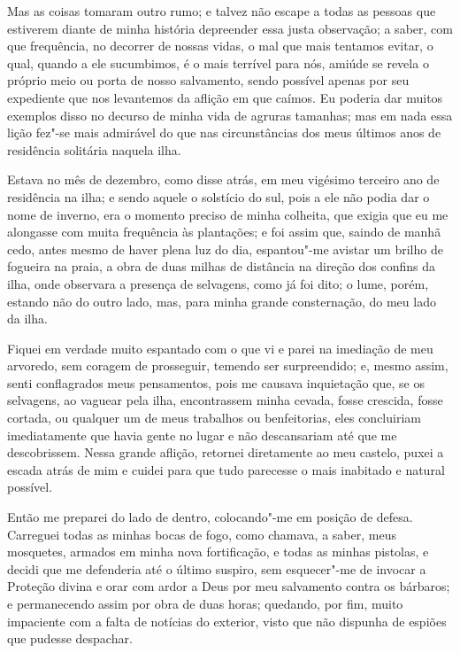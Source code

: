 Mas as coisas tomaram outro rumo; e talvez não escape a todas as pessoas
que estiverem diante de minha história depreender essa justa observação;
a saber, com que frequência, no decorrer de nossas vidas, o mal que mais
tentamos evitar, o qual, quando a ele sucumbimos, é o mais terrível para
nós, amiúde se revela o próprio meio ou porta de nosso salvamento, sendo
possível apenas por seu expediente que nos levantemos da aflição em que
caímos. Eu poderia dar muitos exemplos disso no decurso de minha vida de
agruras tamanhas; mas em nada essa lição fez"-se mais admirável do que
nas circunstâncias dos meus últimos anos de residência solitária naquela
ilha.

Estava no mês de dezembro, como disse atrás, em meu vigésimo terceiro
ano de residência na ilha; e sendo aquele o solstício do sul, pois a ele
não podia dar o nome de inverno, era o momento preciso de minha
colheita, que exigia que eu me alongasse com muita frequência às
plantações; e foi assim que, saindo de manhã cedo, antes mesmo de haver
plena luz do dia, espantou"-me avistar um brilho de fogueira na praia, a
obra de duas milhas de distância na direção dos confins da ilha, onde
observara a presença de selvagens, como já foi dito; o lume, porém,
estando não do outro lado, mas, para minha grande consternação, do meu
lado da ilha.

Fiquei em verdade muito espantado com o que vi e parei na imediação de
meu arvoredo, sem coragem de prosseguir, temendo ser surpreendido; e,
mesmo assim, senti conflagrados meus pensamentos, pois me causava
inquietação que, se os selvagens, ao vaguear pela ilha, encontrassem
minha cevada, fosse crescida, fosse cortada, ou qualquer um de meus
trabalhos ou benfeitorias, eles concluiriam imediatamente que havia
gente no lugar e não descansariam até que me descobrissem. Nessa grande
aflição, retornei diretamente ao meu castelo, puxei a escada atrás de
mim e cuidei para que tudo parecesse o mais inabitado e natural
possível.

Então me preparei do lado de dentro, colocando"-me em posição de defesa.
Carreguei todas as minhas bocas de fogo, como chamava, a saber, meus
mosquetes, armados em minha nova fortificação, e todas as minhas
pistolas, e decidi que me defenderia até o último suspiro, sem
esquecer"-me de invocar a Proteção divina e orar com ardor a Deus por meu
salvamento contra os bárbaros; e permanecendo assim por obra de duas
horas; quedando, por fim, muito impaciente com a falta de notícias do
exterior, visto que não dispunha de espiões que pudesse despachar.

